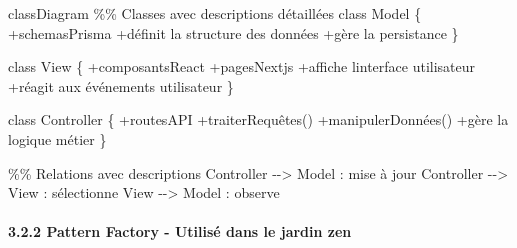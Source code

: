 \documentclass[
]{article}
\newenvironment{Shaded}{}{}
\newcommand{\NormalTok}[1]{#1}
\begin{document}
\begin{Shaded}
\begin{Highlighting}[]
\NormalTok{classDiagram}
\NormalTok{    \%\% Classes avec descriptions détaillées}
\NormalTok{    class Model \{}
\NormalTok{        +schemasPrisma}
\NormalTok{        +définit la structure des données}
\NormalTok{        +gère la persistance}
\NormalTok{    \}}
    
\NormalTok{    class View \{}
\NormalTok{        +composantsReact}
\NormalTok{        +pagesNextjs}
\NormalTok{        +affiche l\textquotesingle{}interface utilisateur}
\NormalTok{        +réagit aux événements utilisateur}
\NormalTok{    \}}
    
\NormalTok{    class Controller \{}
\NormalTok{        +routesAPI}
\NormalTok{        +traiterRequêtes()}
\NormalTok{        +manipulerDonnées()}
\NormalTok{        +gère la logique métier}
\NormalTok{    \}}
    
\NormalTok{    \%\% Relations avec descriptions}
\NormalTok{    Controller {-}{-}\textgreater{} Model : mise à jour}
\NormalTok{    Controller {-}{-}\textgreater{} View : sélectionne}
\NormalTok{    View {-}{-}\textgreater{} Model : observe}
\end{Highlighting}
\end{Shaded}

\paragraph{3.2.2 Pattern Factory - Utilisé dans le jardin
zen}\label{pattern-factory---utilisuxe9-dans-le-jardin-zen}
\end{document}
